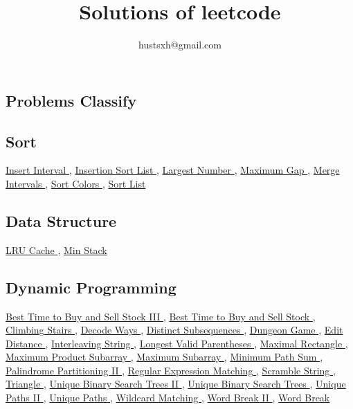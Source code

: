 \documentclass{article}
\begin{document}
\begin{CJK*}{UTF8}{gkai}
\CJKindent
\title{Solutions of leetcode}
\author{hustsxh@gmail.com}

\maketitle

	
\section{Problems Classify}

\subsection*{ Sort }
\label{ Sort }
\hyperref[ Insert Interval ]{ Insert Interval },
\hyperref[ Insertion Sort List ]{ Insertion Sort List },
\hyperref[ Largest Number ]{ Largest Number },
\hyperref[ Maximum Gap ]{ Maximum Gap },
\hyperref[ Merge Intervals ]{ Merge Intervals },
\hyperref[ Sort Colors ]{ Sort Colors },
\hyperref[ Sort List ]{ Sort List }

\subsection*{ Data Structure }
\label{ Data Structure }
\hyperref[ LRU Cache ]{ LRU Cache },
\hyperref[ Min Stack ]{ Min Stack }

\subsection*{ Dynamic Programming }
\label{ Dynamic Programming }
\hyperref[ Best Time to Buy and Sell Stock III ]{ Best Time to Buy and Sell Stock III },
\hyperref[ Best Time to Buy and Sell Stock ]{ Best Time to Buy and Sell Stock },
\hyperref[ Climbing Stairs ]{ Climbing Stairs },
\hyperref[ Decode Ways ]{ Decode Ways },
\hyperref[ Distinct Subsequences ]{ Distinct Subsequences },
\hyperref[ Dungeon Game ]{ Dungeon Game },
\hyperref[ Edit Distance ]{ Edit Distance },
\hyperref[ Interleaving String ]{ Interleaving String },
\hyperref[ Longest Valid Parentheses ]{ Longest Valid Parentheses },
\hyperref[ Maximal Rectangle ]{ Maximal Rectangle },
\hyperref[ Maximum Product Subarray ]{ Maximum Product Subarray },
\hyperref[ Maximum Subarray ]{ Maximum Subarray },
\hyperref[ Minimum Path Sum ]{ Minimum Path Sum },
\hyperref[ Palindrome Partitioning II ]{ Palindrome Partitioning II },
\hyperref[ Regular Expression Matching ]{ Regular Expression Matching },
\hyperref[ Scramble String ]{ Scramble String },
\hyperref[ Triangle ]{ Triangle },
\hyperref[ Unique Binary Search Trees II ]{ Unique Binary Search Trees II },
\hyperref[ Unique Binary Search Trees ]{ Unique Binary Search Trees },
\hyperref[ Unique Paths II ]{ Unique Paths II },
\hyperref[ Unique Paths ]{ Unique Paths },
\hyperref[ Wildcard Matching ]{ Wildcard Matching },
\hyperref[ Word Break II ]{ Word Break II },
\hyperref[ Word Break ]{ Word Break }


\end{CJK*}
\end{document}
